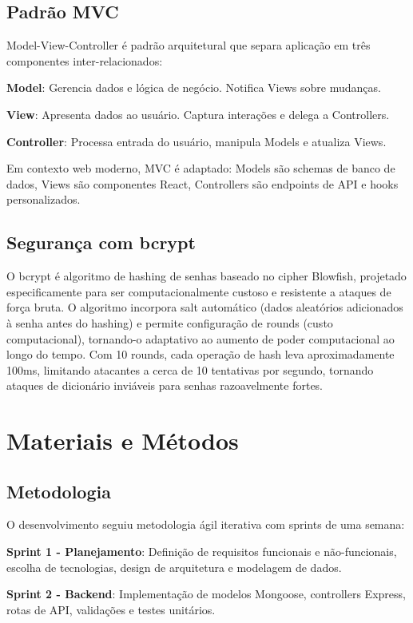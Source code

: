 \documentclass[conference]{IEEEtran}
\begin{document}
\subsection{Padrão MVC}
Model-View-Controller é padrão arquitetural que separa aplicação em três componentes inter-relacionados:

\textbf{Model}: Gerencia dados e lógica de negócio. Notifica Views sobre mudanças.

\textbf{View}: Apresenta dados ao usuário. Captura interações e delega a Controllers.

\textbf{Controller}: Processa entrada do usuário, manipula Models e atualiza Views.

Em contexto web moderno, MVC é adaptado: Models são schemas de banco de dados, Views são componentes React, Controllers são endpoints de API e hooks personalizados.

\subsection{Segurança com bcrypt}
O bcrypt \cite{bcrypt:2024} é algoritmo de hashing de senhas baseado no cipher Blowfish, projetado especificamente para ser computacionalmente custoso e resistente a ataques de força bruta. O algoritmo incorpora salt automático (dados aleatórios adicionados à senha antes do hashing) e permite configuração de rounds (custo computacional), tornando-o adaptativo ao aumento de poder computacional ao longo do tempo. Com 10 rounds, cada operação de hash leva aproximadamente 100ms, limitando atacantes a cerca de 10 tentativas por segundo, tornando ataques de dicionário inviáveis para senhas razoavelmente fortes.

\section{Materiais e Métodos}

\subsection{Metodologia}

O desenvolvimento seguiu metodologia ágil iterativa com sprints de uma semana:

\textbf{Sprint 1 - Planejamento}: Definição de requisitos funcionais e não-funcionais, escolha de tecnologias, design de arquitetura e modelagem de dados.

\textbf{Sprint 2 - Backend}: Implementação de modelos Mongoose, controllers Express, rotas de API, validações e testes unitários.
\end{document}
